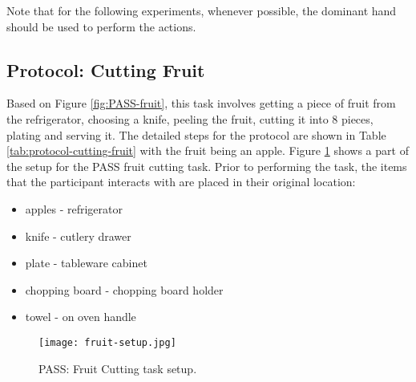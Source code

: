 Note that for the following experiments, whenever possible, the dominant hand should be used to perform the actions.

\subsection{Protocol: Cutting Fruit}
Based on Figure \ref{fig:PASS-fruit}, this task involves getting a piece of fruit from the refrigerator, choosing a knife, peeling the fruit, cutting it into 8 pieces, plating and serving it. The detailed steps for the protocol are shown in Table \ref{tab:protocol-cutting-fruit} with the fruit being an apple. Figure \ref{fig:PASS-fruit-setup} shows a part of the setup for the PASS fruit cutting task. Prior to performing the task, the items that the participant interacts with are placed in their original location:

\begin{itemize}
    \item apples - refrigerator
    \item knife - cutlery drawer
    \item plate - tableware cabinet
    \item chopping board - chopping board holder
    \item towel - on oven handle
\end{itemize}

\begin{figure}[ht]
    \centering
    \texttt{[image: fruit-setup.jpg]}
    \caption{PASS: Fruit Cutting task setup.}
    \label{fig:PASS-fruit-setup}
\end{figure}


